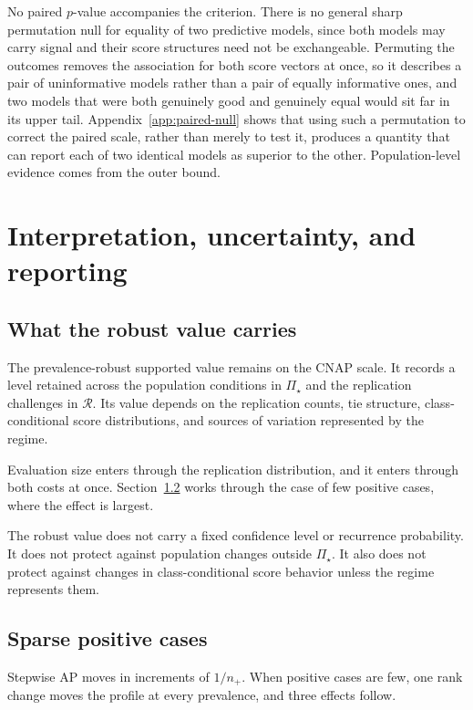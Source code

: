 \documentclass[11pt]{article}
\newcommand{\Regime}{\mathcal{R}}
\newcommand{\PSet}{\Pi_\star}
\theoremstyle{remark}
\begin{document}
No paired $p$-value accompanies the criterion. There is no general sharp permutation null for equality of two predictive models, since both models may carry signal and their score structures need not be exchangeable. Permuting the outcomes removes the association for both score vectors at once, so it describes a pair of uninformative models rather than a pair of equally informative ones, and two models that were both genuinely good and genuinely equal would sit far in its upper tail. Appendix~\ref{app:paired-null} shows that using such a permutation to correct the paired scale, rather than merely to test it, produces a quantity that can report each of two identical models as superior to the other. Population-level evidence comes from the outer bound.

\section{Interpretation, uncertainty, and reporting}
\label{sec:reporting}

\subsection{What the robust value carries}

The prevalence-robust supported value remains on the CNAP scale. It records a level retained across the population conditions in $\PSet$ and the replication challenges in $\Regime$. Its value depends on the replication counts, tie structure, class-conditional score distributions, and sources of variation represented by the regime.

Evaluation size enters through the replication distribution, and it enters through both costs at once. Section~\ref{sec:sparse} works through the case of few positive cases, where the effect is largest.

The robust value does not carry a fixed confidence level or recurrence probability. It does not protect against population changes outside $\PSet$. It also does not protect against changes in class-conditional score behavior unless the regime represents them.

\subsection{Sparse positive cases}
\label{sec:sparse}

Stepwise AP moves in increments of $1/n_+$. When positive cases are few, one rank change moves the profile at every prevalence, and three effects follow.
\end{document}
